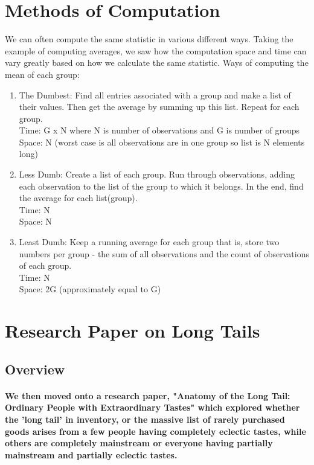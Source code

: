 \section{Methods of Computation}
We can often compute the same statistic in various different ways. Taking the example of computing averages, we saw how the computation space and time can vary greatly based on how we calculate the same statistic. 
Ways of computing the mean of each group:
\begin{enumerate}
  \item The Dumbest: Find all entries associated with a group and make a list of their values. Then get the average by summing up this list. Repeat for each group. \\
  Time: G x N where N is number of observations and G is number of groups\\
  Space: N (worst case is all observations are in one group so list is N elements long)
  \item Less Dumb: Create a list of each group. Run through observations, adding each observation to the list of the group to which it belongs.
  In the end, find the average for each list(group). \\
  Time: N\\
  Space: N
  \item Least Dumb: Keep a running average for each group that is, store two numbers per group - the sum of all observations and the count of observations of each group. \\
  Time: N \\
  Space: 2G (approximately equal to G)
\end{enumerate}


\section{Research Paper on Long Tails}
\subsection{Overview}
\paragraph{We then moved onto a research paper, "Anatomy of the Long Tail:
Ordinary People with Extraordinary Tastes" which explored whether the 'long tail' in inventory, or the massive list of rarely purchased goods arises from a few people having completely eclectic tastes, while others are completely mainstream or everyone having partially mainstream and partially eclectic tastes.}

